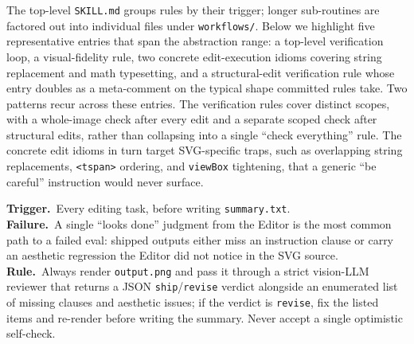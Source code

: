 \documentclass[11pt]{article}
\begin{document}
\noindent The top-level \texttt{SKILL.md} groups rules by their
trigger; longer sub-routines are factored out into individual
files under \texttt{workflows/}.  Below we highlight five
representative entries that span the abstraction range: a
top-level verification loop, a visual-fidelity rule, two
concrete edit-execution idioms covering string replacement and
math typesetting, and a structural-edit verification rule whose
entry doubles as a meta-comment on the typical shape committed
rules take.  Two patterns recur across these entries.  The
verification rules cover distinct scopes, with a whole-image
check after every edit and a separate scoped check after
structural edits, rather than collapsing into a single
``check everything'' rule.  The concrete edit idioms in turn
target SVG-specific traps, such as overlapping string
replacements, \texttt{<tspan>} ordering, and \texttt{viewBox}
tightening, that a generic ``be careful'' instruction would
never surface.

\begin{tcolorbox}[
  enhanced, breakable,
  colback=cardVerif!4!white, colframe=cardVerif,
  colbacktitle=cardVerif, coltitle=white,
  fonttitle=\bfseries\small,
  title={Render-and-Verify Loop\hfill \scriptsize\textsc{Verification}},
  boxrule=0.4pt, arc=2pt,
  left=4pt, right=4pt, top=4pt, bottom=4pt,
  before skip=4pt, after skip=4pt
]
\small
\textbf{Trigger.}\ Every editing task, before writing
\texttt{summary.txt}.\\[2pt]
\textbf{Failure.}\ A single ``looks done'' judgment from the
Editor is the most common path to a failed eval: shipped
outputs either miss an instruction clause or carry an aesthetic
regression the Editor did not notice in the SVG source.\\[2pt]
\textbf{Rule.}\ Always render \texttt{output.png} and pass it
through a strict vision-LLM reviewer that returns a JSON
\texttt{ship}/\texttt{revise} verdict alongside an enumerated
list of missing clauses and aesthetic issues; if the verdict is
\texttt{revise}, fix the listed items and re-render before
writing the summary.  Never accept a single optimistic
self-check.
\end{tcolorbox}
\end{document}
